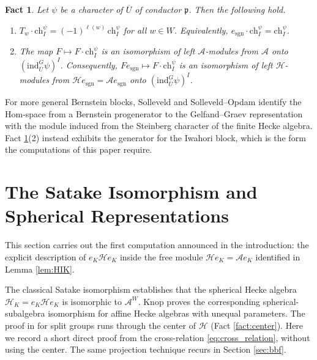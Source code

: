\documentclass[12pt]{article}
\numberwithin{equation}{section}
\newtheorem{fact}[theorem]{Fact}
\theoremstyle{definition}
\theoremstyle{remark}
\theoremstyle{plain}
\begin{document}
\begin{fact}\label{fact:CS}
Let $\psi$ be a character of $\overline{U}$ of conductor $\mathfrak{p}$. Then the following hold.
\begin{enumerate}
\item $T_w \cdot \mathrm{ch}_I^{\psi} = (-1)^{\ell(w)}\, \mathrm{ch}_I^{\psi}$ for all $w \in W$. Equivalently, $e_{\mathrm{sgn}}\cdot \mathrm{ch}_I^{\psi} = \mathrm{ch}_I^{\psi}$.
\item The map $F \mapsto F\cdot \mathrm{ch}_I^{\psi}$ is an isomorphism of left $\mathcal{A}$-modules from $\mathcal{A}$ onto $(\mathrm{ind}_{\overline{U}}^G \psi)^I$. Consequently, $F e_{\mathrm{sgn}} \mapsto F \cdot \mathrm{ch}_I^{\psi}$ is an isomorphism of left $\mathcal{H}$-modules from $\mathcal{H}e_{\mathrm{sgn}} = \mathcal{A}e_{\mathrm{sgn}}$ onto $(\mathrm{ind}_{\overline{U}}^G \psi)^I$.
\end{enumerate}
\end{fact}


For more general Bernstein blocks, Solleveld \cite{Sol25} and Solleveld--Opdam \cite{SO26} identify the Hom-space from a Bernstein progenerator to the Gelfand--Graev representation with the module induced from the Steinberg character of the finite Hecke algebra. Fact \ref{fact:CS}(2) instead exhibits the generator for the Iwahori block, which is the form the computations of this paper require.


\section{The Satake Isomorphism and Spherical Representations}\label{sec:background}

This section carries out the first computation announced in the introduction: the explicit description of $e_K\mathcal{H}e_K$ inside the free module $\mathcal{H}e_K = \mathcal{A}e_K$ identified in Lemma \ref{lem:HIK}.

The classical Satake isomorphism \cite{Sat63} establishes that the spherical Hecke algebra $\mathcal{H}_K = e_K \mathcal{H} e_K$ is isomorphic to $\mathcal{A}^W$. Knop \cite{Kno05} proves the corresponding spherical-subalgebra isomorphism for affine Hecke algebras with unequal parameters. The proof in \cite{Sav} for split groups runs through the center of $\mathcal{H}$ (Fact \ref{fact:center}). Here we record a short direct proof from the cross-relation \eqref{eq:cross_relation}, without using the center. The same projection technique recurs in Section \ref{sec:bbf}.
\end{document}
